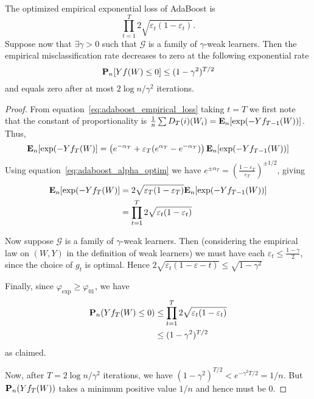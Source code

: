 \begin{theorem}
The optimized empirical exponential loss of AdaBoost is 
\begin{equation*}
	\prod_{t=1}^T 2 \sqrt{\varepsilon_t (1 - \varepsilon_t)}.
\end{equation*}
Suppose now that $\exists \gamma > 0$ such that $\mathcal{G}$ is a family of $\gamma$-weak learners. Then the empirical misclassification rate decreases to zero at the following exponential rate
\begin{equation*}
	\mathbf{P}_n [Yf(W) \le 0] \le (1 - \gamma^2)^{T/2}
\end{equation*}
and equals zero after at most $2\log n/\gamma^2$ iterations.

\begin{proof}
From equation~\eqref{eq:adaboost_empirical_loss} taking $t=T$ we first note that the constant of proportionality is $\frac{1}{n}\sum D_T(i)(W_i) = \mathbf{E}_n [\exp(-Yf_{T-1}(W))]$. Thus,
\begin{equation*}
	\E_n[\exp(-Yf_T(W)] = \left( e^{-\alpha_T} + \varepsilon_T(e^{\alpha_T} - e^{-\alpha_T}) \right) \E_n [\exp(-Yf_{T-1}(W))] \\
\end{equation*}
Using equation~\eqref{eq:adaboost_alpha_optim} we have $e^{\pm \alpha_T} = \left(\frac{1 - \varepsilon_T}{\varepsilon_T}\right)^{\pm 1/2}$, giving
\begin{align*}
	\E_n[\exp(-Yf_T(W)] &= 2\sqrt{\varepsilon_T (1-\varepsilon_T)} \E_n [\exp(-Yf_{T-1}(W))] \\
	&= \prod_{t=1}^T 2\sqrt{\varepsilon_t (1-\varepsilon_t)} 
\end{align*}

Now suppose $\mathcal{G}$ is a family of $\gamma$-weak learners. Then (considering the empirical law on $(W, Y)$ in the definition of weak learners) we must have each $\varepsilon_t \le \frac{1 - \gamma}{2}$, since the choice of $g_t$ is optimal. Hence $2\sqrt{\varepsilon_t(1 - \varepsilon-t)} \le \sqrt{1 - \gamma^2}$

Finally, since $\varphi_\text{exp} \ge \varphi_{01}$, we have
\begin{align*}
	\Prob_n(Yf_T(W) \le 0) &\le \prod_{t=1}^T 2\sqrt{\varepsilon_t (1-\varepsilon_t)} \\
	&\le (1 - \gamma^2)^{T/2}
\end{align*}
as claimed.

Now, after $T = 2\log n/\gamma^2$ iterations, we have $(1 - \gamma^2)^{T/2} < e^{-\gamma^2 T/2} = 1/n$. But $\mathbf{P} _n(Yf_T(W))$ takes a minimum positive value $1/n$ and hence must be $0$.

\end{proof}
\end{theorem}




